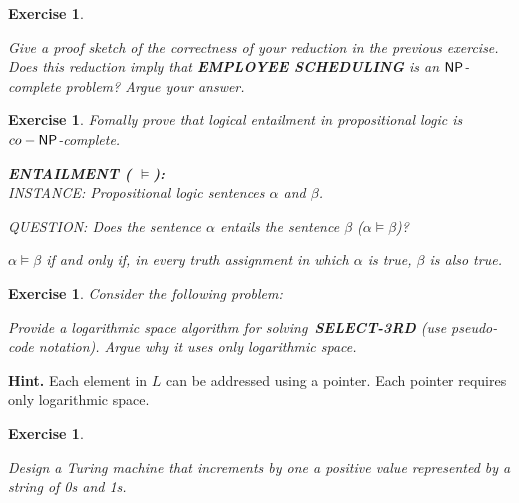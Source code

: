 \documentclass [11pt]{article}
\newtheorem{exercise}[theorem]{Exercise}
\newcommand{\ccfont}[1]{\protect\mathsf{#1}}
\newcommand{\NP}{\ccfont{NP}}
\newcommand{\solution}[1]{\noindent {\bf Solution.}  #1}
\begin{document}


\begin{exercise}

  \label{ex:Scheduling2}

  Give a proof sketch of the correctness of your reduction in the previous exercise. Does this reduction imply that \textbf{EMPLOYEE SCHEDULING} is an $\NP$-complete problem? Argue your answer.  
   
\end{exercise}





\begin{exercise}
  \label{ex:CO-NP}
Fomally prove that logical entailment in propositional logic is $co-\NP$-complete. 
 
\medskip   
\noindent 
\textbf{ENTAILMENT ( $\models$):} \\
\noindent 
INSTANCE: Propositional logic sentences $\alpha$ and $\beta$. 

\noindent 
QUESTION: Does the sentence $\alpha$ entails the sentence $\beta$  ($\alpha \models \beta$)? 

\medskip

\noindent $\alpha \models \beta$ if and only if, in every truth assignment in which $\alpha$ is true, $\beta$ is also true.    

  
  
\end{exercise}

\newpage

\begin{exercise}
  Consider the following problem:

  \begin{center}
  \end{center}


  \medskip Provide a logarithmic space algorithm for
  solving~\textbf{SELECT-3RD} (use pseudo-code notation). Argue why it
  uses only logarithmic space.
\end{exercise}
\noindent \textbf{Hint.} Each element in $L$ can be addressed using a
pointer. Each pointer requires only logarithmic space.





\begin{exercise}
  \label{ex:turing}

  Design a Turing machine that increments by one a positive value represented by a string of 0s and 1s.

\end{exercise}


\end{document}
